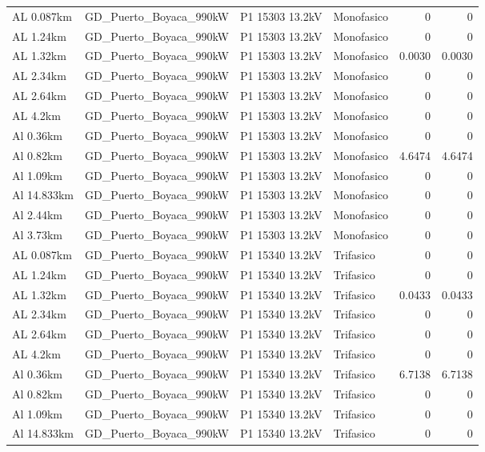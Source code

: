 \documentclass[11pt,a4paper]{article}
\begin{document}
\begin{longtable}{llllrr}
AL 0.087km & GD\_Puerto\_Boyaca\_990kW & P1 15303 13.2kV & Monofasico & 0 & 0 \\
AL 1.24km & GD\_Puerto\_Boyaca\_990kW & P1 15303 13.2kV & Monofasico & 0 & 0 \\
AL 1.32km & GD\_Puerto\_Boyaca\_990kW & P1 15303 13.2kV & Monofasico & 0.0030 & 0.0030 \\
AL 2.34km & GD\_Puerto\_Boyaca\_990kW & P1 15303 13.2kV & Monofasico & 0 & 0 \\
AL 2.64km & GD\_Puerto\_Boyaca\_990kW & P1 15303 13.2kV & Monofasico & 0 & 0 \\
AL 4.2km & GD\_Puerto\_Boyaca\_990kW & P1 15303 13.2kV & Monofasico & 0 & 0 \\
Al 0.36km & GD\_Puerto\_Boyaca\_990kW & P1 15303 13.2kV & Monofasico & 0 & 0 \\
Al 0.82km & GD\_Puerto\_Boyaca\_990kW & P1 15303 13.2kV & Monofasico & 4.6474 & 4.6474 \\
Al 1.09km & GD\_Puerto\_Boyaca\_990kW & P1 15303 13.2kV & Monofasico & 0 & 0 \\
Al 14.833km & GD\_Puerto\_Boyaca\_990kW & P1 15303 13.2kV & Monofasico & 0 & 0 \\
Al 2.44km & GD\_Puerto\_Boyaca\_990kW & P1 15303 13.2kV & Monofasico & 0 & 0 \\
Al 3.73km & GD\_Puerto\_Boyaca\_990kW & P1 15303 13.2kV & Monofasico & 0 & 0 \\
AL 0.087km & GD\_Puerto\_Boyaca\_990kW & P1 15340 13.2kV & Trifasico & 0 & 0 \\
AL 1.24km & GD\_Puerto\_Boyaca\_990kW & P1 15340 13.2kV & Trifasico & 0 & 0 \\
AL 1.32km & GD\_Puerto\_Boyaca\_990kW & P1 15340 13.2kV & Trifasico & 0.0433 & 0.0433 \\
AL 2.34km & GD\_Puerto\_Boyaca\_990kW & P1 15340 13.2kV & Trifasico & 0 & 0 \\
AL 2.64km & GD\_Puerto\_Boyaca\_990kW & P1 15340 13.2kV & Trifasico & 0 & 0 \\
AL 4.2km & GD\_Puerto\_Boyaca\_990kW & P1 15340 13.2kV & Trifasico & 0 & 0 \\
Al 0.36km & GD\_Puerto\_Boyaca\_990kW & P1 15340 13.2kV & Trifasico & 6.7138 & 6.7138 \\
Al 0.82km & GD\_Puerto\_Boyaca\_990kW & P1 15340 13.2kV & Trifasico & 0 & 0 \\
Al 1.09km & GD\_Puerto\_Boyaca\_990kW & P1 15340 13.2kV & Trifasico & 0 & 0 \\
Al 14.833km & GD\_Puerto\_Boyaca\_990kW & P1 15340 13.2kV & Trifasico & 0 & 0 \\

\end{longtable}
\end{document}
